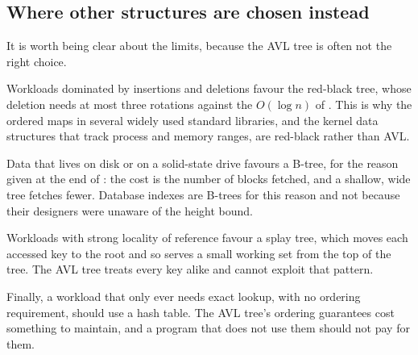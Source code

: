 \subsection{Where other structures are chosen instead}

It is worth being clear about the limits, because the AVL tree is often not the
right choice.

Workloads dominated by insertions and deletions favour the red-black tree, whose
deletion needs at most three rotations against the $O(\log n)$ of
. This is why the ordered maps in several widely used
standard libraries, and the kernel data structures that track process and memory
ranges, are red-black rather than AVL.

Data that lives on disk or on a solid-state drive favours a B-tree, for the
reason given at the end of : the cost is the number of
blocks fetched, and a shallow, wide tree fetches fewer. Database indexes are
B-trees for this reason and not because their designers were unaware of the
height bound.

Workloads with strong locality of reference favour a splay tree, which moves each
accessed key to the root and so serves a small working set from the top of the
tree. The AVL tree treats every key alike and cannot exploit that pattern.

Finally, a workload that only ever needs exact lookup, with no ordering
requirement, should use a hash table. The AVL tree's ordering guarantees cost
something to maintain, and a program that does not use them should not pay for
them.

